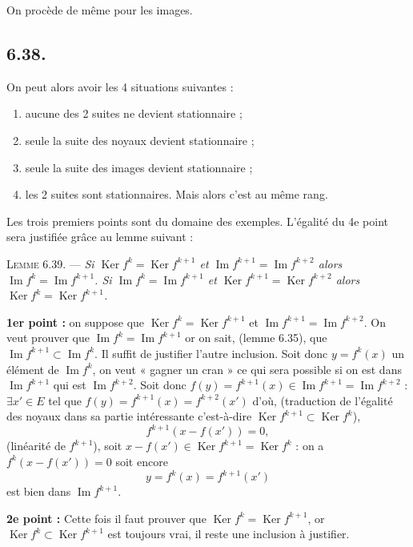 On procède de même pour les images.

\subsection*{6.38.}
On peut alors avoir les 4 situations suivantes :
\begin{enumerate}[label=\arabic*),leftmargin=2.1em]
\item aucune des 2 suites ne devient stationnaire ;
\item seule la suite des noyaux devient stationnaire ;
\item seule la suite des images devient stationnaire ;
\item les 2 suites sont stationnaires. Mais alors c'est au même rang.
\end{enumerate}
Les trois premiers points sont du domaine des exemples. L'égalité du 4e point sera justifiée grâce au lemme suivant :

\medskip\noindent\textsc{Lemme 6.39.} --- \emph{Si $\operatorname{Ker}f^k=\operatorname{Ker}f^{k+1}$ et $\operatorname{Im}f^{k+1}=\operatorname{Im}f^{k+2}$ alors $\operatorname{Im}f^k=\operatorname{Im}f^{k+1}$. Si $\operatorname{Im}f^k=\operatorname{Im}f^{k+1}$ et $\operatorname{Ker}f^{k+1}=\operatorname{Ker}f^{k+2}$ alors $\operatorname{Ker}f^k=\operatorname{Ker}f^{k+1}$.}

\textbf{1er point :} on suppose que $\operatorname{Ker}f^k=\operatorname{Ker}f^{k+1}$ et $\operatorname{Im}f^{k+1}=\operatorname{Im}f^{k+2}$. On veut prouver que $\operatorname{Im}f^k=\operatorname{Im}f^{k+1}$ or on sait, (lemme 6.35), que $\operatorname{Im}f^{k+1}\subset\operatorname{Im}f^k$. Il suffit de justifier l'autre inclusion. Soit donc $y=f^k(x)$ un élément de $\operatorname{Im}f^k$, on veut « gagner un cran » ce qui sera possible si on est dans $\operatorname{Im}f^{k+1}$ qui est $\operatorname{Im}f^{k+2}$. Soit donc $f(y)=f^{k+1}(x)\in\operatorname{Im}f^{k+1}=\operatorname{Im}f^{k+2}$ : $\exists x'\in E$ tel que $f(y)=f^{k+1}(x)=f^{k+2}(x')$ d'où, (traduction de l'égalité des noyaux dans sa partie intéressante c'est-à-dire $\operatorname{Ker}f^{k+1}\subset\operatorname{Ker}f^k$),
\[
f^{k+1}(x-f(x'))=0,
\]
(linéarité de $f^{k+1}$), soit $x-f(x')\in\operatorname{Ker}f^{k+1}=\operatorname{Ker}f^k$ : on a $f^k(x-f(x'))=0$ soit encore
\[
y=f^k(x)=f^{k+1}(x')
\]
est bien dans $\operatorname{Im}f^{k+1}$.

\textbf{2e point :} Cette fois il faut prouver que $\operatorname{Ker}f^k=\operatorname{Ker}f^{k+1}$, or $\operatorname{Ker}f^k\subset\operatorname{Ker}f^{k+1}$ est toujours vrai, il reste une inclusion à justifier.

